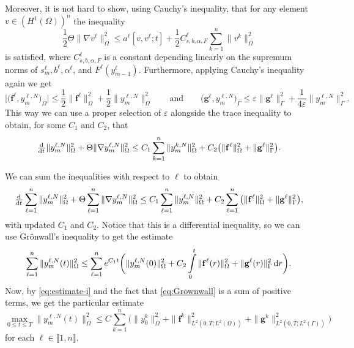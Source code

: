 \documentclass[11pt]{article}
\newcommand{\llb}{\llbracket}
\newcommand{\rrb}{\rrbracket}
\numberwithin{equation}{section}
\begin{document}
	Moreover, it is not hard to show, using Cauchy's inequality, that for any element \(v\in (H^1(\Omega))^n\) the inequality
	\[
		\frac{1}{2} {\Theta} \|\nabla v^\ell \|^2_{\Omega}
		\leq a^\ell [v,v^\ell;t]  + \frac{1}{2} C_{s,b,\alpha,F}^\ell \sum_{k=1}^n \|v^k\|^2_{\Omega} 
	\]
	is satisfied, where \(C_{s,b,\alpha,F}^\ell\) is a constant depending linearly on the supremum norms of \(s_m^\ell, b^\ell, \alpha^\ell\), and \(F^\ell(y_{m-1}^\ell)\). Furthermore, applying Cauchy's inequality again we get
	\[
		\big| \big( \mathbf{f}^\ell ,  y_m^{\ell,N} \big)_{\Omega} \big| \leq \frac{1}{2} \|\mathbf{f}^\ell \|^2_{\Omega} + \frac{1}{2} \| y_m^{\ell,N}\|_{\Omega}^2
		\qquad\text{and}\qquad
		\big(\mathbf{g}^\ell ,   y_m^{\ell,N} \big)_\Gamma
		\leq \varepsilon \|\mathbf{g}^\ell \|^2_{\Gamma} + \frac{1}{4\varepsilon} \| y_m^{\ell,N}\|_{\Gamma}^2.
	\]
	This way we can use a proper selection of \(\varepsilon\) alongside the trace inequality \cite{Evans-2010} to obtain, for some \(C_1\) and \(C_2\), that
	\[
		\od{ }{t} \|  y_m^{\ell,N} \|^2_\Omega + {\Theta} \|\nabla  y_m^{\ell,N}\|^2_{\Omega}
		\leq C_1 \sum_{k=1}^n \| y_m^{k,N}\|^2_{\Omega} + C_2\big(\|\mathbf{f}^\ell \|^2_{\Omega} + \|\mathbf{g}^\ell \|^2_{\Gamma} \big).
	\]

	We can sum the inequalities with respect to \(\ell\) to obtain
	\begin{equation}
	\label{eq:estimate-differential}
		\od{ }{t} \sum_{\ell=1}^n \|  y_m^{\ell,N} \|^2_\Omega + {\Theta} \sum_{\ell=1}^n \| \nabla  y_m^{\ell,N}\|^2_{\Omega}
		\leq C_1 \sum_{\ell=1}^n \| y_m^{\ell,N}\|^2_{\Omega} + C_2 \sum_{\ell=1}^n \big(\|\mathbf{f}^\ell\|^2_{\Omega} + \|\mathbf{g}^\ell\|^2_{\Gamma} \big),
	\end{equation}
	with updated \(C_1\) and \(C_2\).
	Notice that this is a differential inequality, so we can use Grönwall's inequality \cite{Evans-2010} to get the estimate
	\begin{equation}
	\label{eq:Grownwall}
		\sum_{\ell=1}^n \|  y_m^{\ell,N} (t) \|^2_\Omega \leq \sum_{\ell=1}^n  e^{C_1 t} \bigg(  \|  y_m^{\ell,N} (0) \|^2_\Omega
			+ C_2 \int\limits_0^t \|\mathbf{f}^\ell (r)\|^2_{\Omega} + \|\mathbf{g}^\ell (r)\|^2_{\Gamma} \dif r
		\bigg).
	\end{equation}
	Now, by \eqref{eq:estimate-i} and the fact that \eqref{eq:Grownwall} is a sum of positive terms, we get the particular estimate
	\begin{equation}
	\label{eq:estimate-maxnorm}
		\max_{0\leq t \leq T} \|  y_m^{\ell,N} (t) \|^2_\Omega \leq C \sum_{k=1}^n  \bigg(  \|  y_0^k \|^2_\Omega
			+ \|\mathbf{f}^k\|^2_{L^2(0,T;L^2(\Omega))} + \|\mathbf{g}^k\|^2_{L^2(0,T;L^2(\Gamma))}
		\bigg)
	\end{equation}
	for each \(\ell \in \llb 1,n\rrb\).
	
\end{document}
